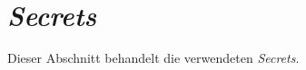 \section{\emph{Secrets}}
\label{sec:buildserver-secrets}
Dieser Abschnitt behandelt die verwendeten \emph{Secrets}.